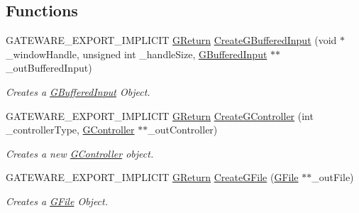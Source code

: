 \subsection*{Functions}
\begin{DoxyCompactItemize}
\item 
G\+A\+T\+E\+W\+A\+R\+E\+\_\+\+E\+X\+P\+O\+R\+T\+\_\+\+I\+M\+P\+L\+I\+C\+IT \mbox{\hyperlink{namespace_g_w_a67a839e3df7ea8a5c5686613a7a3de21}{G\+Return}} \mbox{\hyperlink{namespace_g_w_1_1_s_y_s_t_e_m_ad32802f3cb2ba314449915b556af4a33}{Create\+G\+Buffered\+Input}} (void $\ast$\+\_\+window\+Handle, unsigned int \+\_\+handle\+Size, \mbox{\hyperlink{class_g_w_1_1_s_y_s_t_e_m_1_1_g_buffered_input}{G\+Buffered\+Input}} $\ast$$\ast$\+\_\+out\+Buffered\+Input)
\begin{DoxyCompactList}\small\item\em Creates a \mbox{\hyperlink{class_g_w_1_1_s_y_s_t_e_m_1_1_g_buffered_input}{G\+Buffered\+Input}} Object. \end{DoxyCompactList}\item 
\mbox{\label{namespace_g_w_1_1_s_y_s_t_e_m_a1550dcf674356c9e76ec056ae53526c1}} 
G\+A\+T\+E\+W\+A\+R\+E\+\_\+\+E\+X\+P\+O\+R\+T\+\_\+\+I\+M\+P\+L\+I\+C\+IT \mbox{\hyperlink{namespace_g_w_a67a839e3df7ea8a5c5686613a7a3de21}{G\+Return}} \mbox{\hyperlink{namespace_g_w_1_1_s_y_s_t_e_m_a1550dcf674356c9e76ec056ae53526c1}{Create\+G\+Controller}} (int \+\_\+controller\+Type, \mbox{\hyperlink{class_g_w_1_1_s_y_s_t_e_m_1_1_g_controller}{G\+Controller}} $\ast$$\ast$\+\_\+out\+Controller)
\begin{DoxyCompactList}\small\item\em Creates a new \mbox{\hyperlink{class_g_w_1_1_s_y_s_t_e_m_1_1_g_controller}{G\+Controller}} object. \end{DoxyCompactList}\item 
G\+A\+T\+E\+W\+A\+R\+E\+\_\+\+E\+X\+P\+O\+R\+T\+\_\+\+I\+M\+P\+L\+I\+C\+IT \mbox{\hyperlink{namespace_g_w_a67a839e3df7ea8a5c5686613a7a3de21}{G\+Return}} \mbox{\hyperlink{namespace_g_w_1_1_s_y_s_t_e_m_a7f850145f185eed4a6aad4f07a2c2a93}{Create\+G\+File}} (\mbox{\hyperlink{class_g_w_1_1_s_y_s_t_e_m_1_1_g_file}{G\+File}} $\ast$$\ast$\+\_\+out\+File)
\begin{DoxyCompactList}\small\item\em Creates a \mbox{\hyperlink{class_g_w_1_1_s_y_s_t_e_m_1_1_g_file}{G\+File}} Object. \end{DoxyCompactList}\item 
$$
\end{DoxyCompactItemize}
